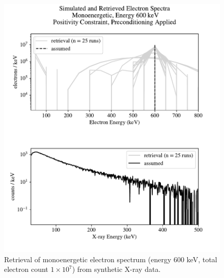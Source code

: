 \begin{figure}[p]
    \centering
    \includegraphics[width=\textwidth]{figures/chapter_4/synthetic_data_examples/mono_600keV_posonly_preconditioning_1e7_particles}
    \caption{Retrieval of monoenergetic electron spectrum (energy 600 keV, total electron count $1\times10^7$) from synthetic X-ray data.}
    \label{why_non_negative_is_good}
\end{figure}

